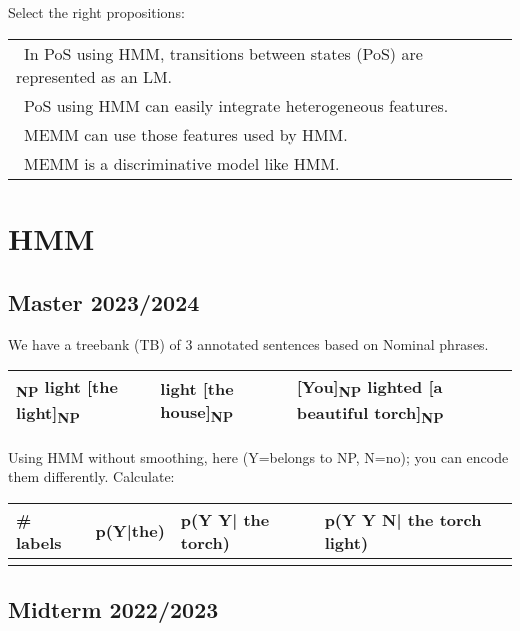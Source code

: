 \documentclass[11pt, a4paper]{article}
\begin{document}
\subsection{}

Select the right propositions:

\begin{longtable}{|p{}|}
	\hline 
	\Square\ In PoS using HMM, transitions between states (PoS) are represented as an LM. \\
	\Square\ PoS using HMM can easily integrate heterogeneous features. \\	
	\Square\ MEMM can use those features used by HMM. \\
	\Square\ MEMM is a discriminative model like HMM. \\
	\hline
\end{longtable}


\section{HMM}

\subsection{Master 2023/2024}

We have a treebank (TB) of 3 annotated sentences based on Nominal phrases.
\begin{center}
	\begin{tabular}{|lll|}
		\hline
		[I]\textsubscript{NP} light [the light]\textsubscript{NP} &
		light [the house]\textsubscript{NP} & 
		[You]\textsubscript{NP} lighted [a beautiful torch]\textsubscript{NP} \\
		\hline
	\end{tabular}
\end{center}

Using HMM without smoothing, here (Y=belongs to NP, N=no); you can encode them differently. Calculate: 

\begin{center}
	\begin{tabular}{|l|l|l|l|}
		\hline
		\# labels & p(Y|the) & p(Y Y| the torch) & p(Y Y N| the torch light) \\
		\hline
		&&&\\
		\hline
	\end{tabular}
\end{center}

\subsection{Midterm 2022/2023}
\end{document}
